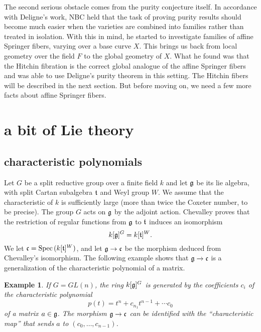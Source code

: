 \documentclass[brochure,english,12pt]{bourbaki}
\newtheorem{example}[equation]{Example}
\def\op#1{{\operatorname{#1}}}
\def\g{\frak{g}}
\def\t{\frak{t}}
\def\c{\frak{c}}
\begin{document}
The second serious obstacle comes from the purity conjecture itself.
In accordance with Deligne's work, NBC held that the task of proving
purity results should become much easier when the varieties are
combined into families rather than treated in isolation.  With this in
mind, he started to investigate families of affine Springer fibers,
varying over a base curve $X$.  This brings us back from local
geometry over the field $F$ to the global geometry of $X$.  What he
found was that the Hitchin fibration is the correct global analogue of
the affine Springer fibers and was able to use Deligne's  purity theorem in this setting.  
The Hitchin fibers will be described in
the next section.  But before moving on, we need a few more facts
about affine Springer fibers.


\section{a bit of Lie theory}



\subsection{characteristic polynomials}



Let $G$ be a split reductive group over a finite field $k$ and let
$\g$ be its lie algebra, with split Cartan subalgebra $\t$ and Weyl
group $W$.  We assume that the characteristic of $k$ is sufficiently
large (more than twice the Coxeter number, to be precise).  The group
$G$ acts on $\g$ by the adjoint action.  Chevalley proves that the restriction  of regular
functions from $\g$ to $\t$ induces an isomorphism
\[
k[\g]^G = k[\t]^W.
\]
We let $\c =  \op{Spec}\,(k[\t]^W)$, and let $\g\to\c$ be the morphism deduced from
Chevalley's isomorphism.  The following example shows that $\g\to\c$ is a generalization
of the characteristic polynomial of a matrix.

\begin{example}
If $G=GL(n)$, the ring $k[\g]^G$ is generated by the coefficients $c_i$ of the characteristic
polynomial 
\begin{equation}
p(t)=t^n + c_{n_1} t^{n-1} +\cdots c_0
\end{equation}
of a matrix $a\in \g$.  The morphism $\g\to\c$ can be identified with
the ``characteristic map'' that sends $a$ to $(c_0,\ldots,c_{n-1})$.
\end{example}
\end{document}
